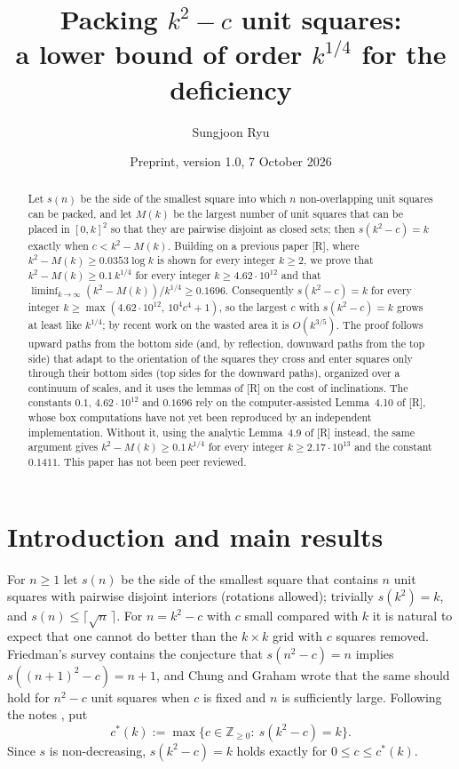 \documentclass[11pt]{amsart}
\title[Deficiency of order $k^{1/4}$]{Packing $k^2-c$ unit squares:\\ a lower bound of order $k^{1/4}$ for the deficiency}
\author{Sungjoon Ryu}
\date{Preprint, version 1.0, 7 October 2026}
\newcommand{\Z}{\mathbb Z}
\theoremstyle{definition}
\theoremstyle{remark}
\numberwithin{equation}{section}
\begin{document}
\begin{abstract}
Let $s(n)$ be the side of the smallest square into which $n$ non-overlapping unit squares can be packed, and let $M(k)$
be the largest number of unit squares that can be placed in $[0,k]^2$ so that they are pairwise disjoint as closed sets;
then $s(k^2-c)=k$ exactly when $c<k^2-M(k)$. Building on a previous paper [R], where $k^2-M(k)\ge0.0353\log k$ is shown
for every integer $k\ge2$, we prove that $k^2-M(k)\ge0.1\,k^{1/4}$ for every integer $k\ge4.62\cdot10^{12}$ and that
$\liminf_{k\to\infty}(k^2-M(k))/k^{1/4}\ge0.1696$. Consequently $s(k^2-c)=k$ for every integer
$k\ge\max(4.62\cdot10^{12},\,10^4c^4+1)$, so the largest $c$ with $s(k^2-c)=k$ grows at least like $k^{1/4}$; by recent
work on the wasted area it is $O(k^{3/5})$. The proof follows upward paths from the bottom side (and, by reflection,
downward paths from the top side) that adapt to the orientation of the squares they cross and enter squares only through
their bottom sides (top sides for the downward paths), organized over a continuum of scales, and it uses the lemmas of
[R] on the cost of inclinations. The constants $0.1$, $4.62\cdot10^{12}$ and $0.1696$ rely on the computer-assisted
Lemma~4.10 of [R], whose box computations have not yet been reproduced by an independent implementation. Without it,
using the analytic Lemma~4.9 of [R] instead, the same argument gives $k^2-M(k)\ge0.1\,k^{1/4}$ for every integer
$k\ge2.17\cdot10^{13}$ and the constant $0.1411$. This paper has not been peer reviewed.
\end{abstract}
\maketitle
\tableofcontents

\section{Introduction and main results}\label{sec:intro}

\providecommand{\theHIntroCount}{\arabic{IntroCount}}
\newenvironment{IntroStatement}[2]{\par\addvspace{\medskipamount}%
  \renewcommand{\theIntroCount}{#2}\refstepcounter{IntroCount}%
  \noindent\textbf{#1~#2.}\ \itshape\ignorespaces}%
 {\par\addvspace{\medskipamount}}

For $n\ge1$ let $s(n)$ be the side of the smallest square that contains $n$ unit squares with pairwise disjoint
interiors (rotations allowed); trivially $s(k^2)=k$, and $s(n)\le\lceil\sqrt n\,\rceil$. For $n=k^2-c$ with $c$ small
compared with $k$ it is natural to expect that one cannot do better than the $k\times k$ grid with $c$ squares removed.
Friedman's survey \cite{Fri} contains the conjecture that $s(n^2-c)=n$ implies $s((n+1)^2-c)=n+1$, and Chung and Graham
\cite[concluding remarks]{CG09} wrote that the same should hold for $n^2-c$ unit squares when $c$ is fixed and $n$ is
sufficiently large. Following the notes \cite[file \texttt{s12/search/FRIEDMAN.md}]{Dan}, put
\[
c^*(k):=\max\{c\in\Z_{\ge0}:\ s(k^2-c)=k\}.
\]
Since $s$ is non-decreasing, $s(k^2-c)=k$ holds exactly for $0\le c\le c^*(k)$.
\end{document}
